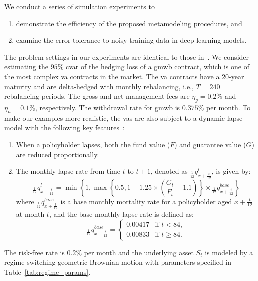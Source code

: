 We conduct a series of simulation experiments to 
\begin{enumerate}
    \item demonstrate the efficiency of the proposed metamodeling procedures, and
    \item examine the error tolerance to noisy training data in deep learning models.
\end{enumerate}
The problem settings in our experiments are identical to those in~\cite{dang2020efficient}.
We consider estimating the $95\%$ \gls{cvar} of the hedging loss of a \gls{gmwb} contract, which is one of the most complex \gls{va} contracts in the market.
The \gls{va} contracts have a 20-year maturity and are delta-hedged with monthly rebalancing, i.e., $T=240$ rebalancing periods.
The gross and net management fees are $\eta_g = 0.2\%$ and $\eta_n=0.1\%$, respectively.
The withdrawal rate for \gls{gmwb} is $0.375\%$ per month.
To make our examples more realistic, the \gls{va}s are also subject to a dynamic lapse model with the following key features~\citep{naic2021}:
\begin{enumerate}
    \item When a policyholder lapses, both the fund value ($F$) and guarantee value ($G$) are reduced proportionally.
    \item The monthly lapse rate from time $t$ to $t + 1$, denoted as ${}_{\frac{1}{12}}q^l_{x+\frac{t}{12}}$, is given by:
    \begin{equation} \label{eq:dynamic_lapse_rate}
        {}_{\frac{1}{12}}q^l_{x+\frac{t}{12}} = \min\left\{1, \max\left\{0.5, 1 - 1.25 \times \left(\frac{G_t}{F_t} - 1.1\right)\right\} \times {}_{\frac{1}{12}}q^{base}_{x+\frac{t}{12}}\right\}
    \end{equation}
    where ${}_{\frac{1}{12}}q^{base}_{x+\frac{t}{12}}$ is a base monthly mortality rate for a policyholder aged $x + \frac{t}{12}$ at month $t$, and the base monthly lapse rate is defined as:
    \begin{equation} \label{eq:lapse_rate}
        {}_{\frac{1}{12}}q^{base}_{x+\frac{t}{12}} = 
        \begin{cases}
            0.00417 & \text{if } t < 84, \\
            0.00833 & \text{if } t \geq 84.
        \end{cases}
    \end{equation}
\end{enumerate}

The risk-free rate is $0.2\%$ per month and the underlying asset $S_t$ is modeled by a regime-switching geometric Brownian motion with parameters specified in Table~\ref{tab:regime_params}.

